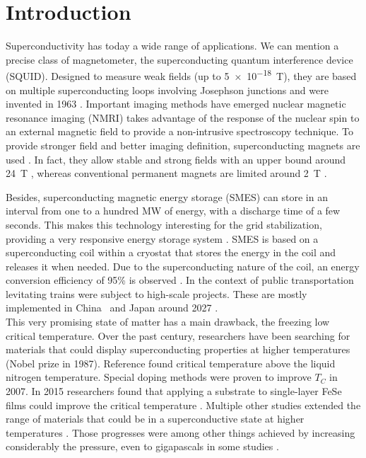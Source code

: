 \documentclass[../main.tex]{subfile}
\begin{document}
\section{Introduction}

Superconductivity has today a wide range of applications. We can mention a precise class of magnetometer, the superconducting quantum interference device (SQUID).
Designed to measure weak fields (up to \SI{5e-18}{\tesla})\cite{Range2004}, they are based on multiple superconducting loops involving Josephson junctions and were invented
in 1963 \cite{JAKLEVIC1964}.
Important imaging methods have emerged nuclear magnetic resonance imaging (NMRI) takes advantage of the response of the nuclear spin to an external 
magnetic field to provide a non-intrusive spectroscopy technique. To provide stronger field and better imaging definition, superconducting magnets are used \cite{Nakamura2015}. In fact, they
allow stable and strong fields with an upper bound around \SI{24}{\tesla} \cite{Hashi2015}, whereas conventional permanent magnets are limited around \SI{2}{\tesla} \cite{Haishi2005}.

Besides, superconducting magnetic energy storage (SMES) can store in an interval from one to a hundred MW of energy, with a discharge time of a few seconds. This makes
this technology interesting for the grid stabilization, providing a very responsive energy storage system \cite{Tixador2008}.
SMES is based on a superconducting coil within a cryostat that stores the energy in the coil and releases it when needed. Due to the superconducting nature of the coil,
an energy conversion efficiency of 95\% is observed \cite{Tixador2008}.
In the context of public transportation levitating trains were subject to high-scale projects. These are mostly implemented in China~\cite{Roque2024} and Japan around 2027 \cite{Nishijima2013}.\\

This very promising state of matter has a main drawback, the freezing low critical temperature. Over the past century, researchers 
have been searching for materials that could display superconducting properties at higher temperatures \cite{Bednorz1986} (Nobel prize in 1987).
Reference \cite{PhysRevLett.58.908} found critical temperature above the liquid nitrogen temperature.
Special doping methods were proven to improve $T_C$ \cite{Doiron-Leyraud2007} in 2007.
In 2015 researchers found that applying a substrate to single-layer FeSe films could improve the critical temperature \cite{Ge2015}.
Multiple other studies extended the range of materials that could be in a superconductive state at higher temperatures \cite{Einaga2016}\cite{Drozdov_2019} \cite{lee2023}.
Those progresses were among other things achieved by increasing considerably the pressure, even to gigapascals in some studies \cite{Drozdov_2019}.\\
\end{document}

